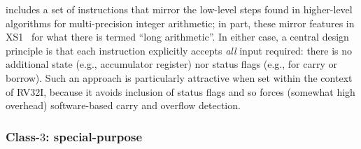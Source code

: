 \XCID includes a set of instructions that mirror the low-level steps found
in higher-level algorithms for multi-precision integer arithmetic; in part,
these mirror features in XS1~\cite[Section 18]{SCARV:XS1:09} for what there
is termed ``long arithmetic''.  In either case, a central design principle 
is that each instruction explicitly accepts {\em all} input required: there
is no additional state (e.g., accumulator register) nor status flags (e.g., 
for carry or borrow).  Such an approach is particularly attractive when set
within the context of RV32I, because it avoids inclusion of status flags
and so forces (somewhat high overhead) software-based carry and overflow 
detection.


\subsubsection{Class-$3$:   special-purpose}
\label{sec:bg:feature:3}

